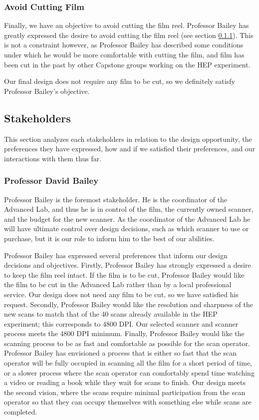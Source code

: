 \documentclass[12pt]{article} %
\begin{document}
\subsubsection{Avoid Cutting Film}
Finally, we have an objective to avoid cutting the film reel. Professor Bailey has greatly expressed the desire to avoid cutting the film reel (see section \ref{profbaileyscanning}). This is not a constraint however, as Professor Bailey has described some conditions under which he would be more comfortable with cutting the film, and film has been cut in the past by other Capstone groups working on the HEP experiment.

Our final design does not require any film to be cut, so we definitely satisfy Professor Bailey's objective.

\subsection{Stakeholders}
This section analyzes each stakeholders in relation to the design opportunity, the preferences they have expressed, how and if we satisfied their preferences, and our interactions with them thus far.

\subsubsection{Professor David Bailey} \label{profbaileyscanning}
Professor Bailey is the foremost stakeholder. He is the coordinator of the Advanced Lab, and thus he is in control of the film, the currently owned scanner, and the budget for the new scanner. As the coordinator of the Advanced Lab he will have ultimate control over design decisions, such as which scanner to use or purchase, but it is our role to inform him to the best of our abilities.

Professor Bailey has expressed several preferences that inform our design decisions and objectives. Firstly, Professor Bailey has strongly expressed a desire to keep the film reel intact. If the film is to be cut, Professor Bailey would like the film to be cut in the Advanced Lab rather than by a local professional service. Our design does not need any film to be cut, so we have satisfied his request. Secondly, Professor Bailey would like the resolution and sharpness of the new scans to match that of the 40 scans already available in the HEP experiment; this corresponds to 4800 DPI. Our selected scanner and scanner process meets the 4800 DPI minimum. Finally, Professor Bailey would like the scanning process to be as fast and comfortable as possible for the scan operator. Professor Bailey has envisioned a process that is either so fast that the scan operator will be fully occupied in scanning all the film for a short period of time, or a slower process where the scan operator can comfortably spend time watching a video or reading a book while they wait for scans to finish. Our design meets the second vision, where the scans require minimal participation from the scan operator so that they can occupy themselves with something else while scans are completed. 
\end{document}
